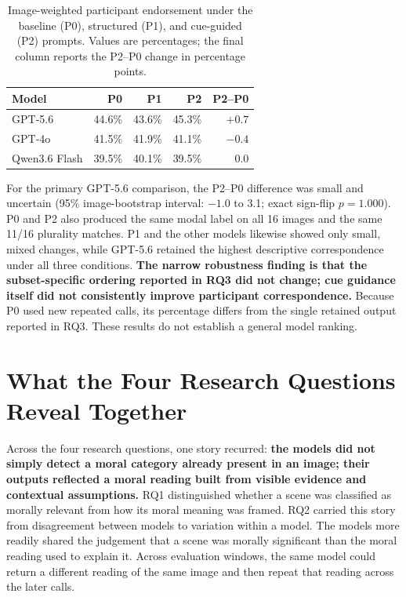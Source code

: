 \begin{table}[H]
    \centering
    \caption{Image-weighted participant endorsement under the baseline (P0),
    structured (P1), and cue-guided (P2) prompts. Values are percentages; the
    final column reports the P2--P0 change in percentage points.}
    \label{tab:prompt_robustness}
    \small
    \begin{tabular}{lrrrr}
        \toprule
        Model & P0 & P1 & P2 & P2--P0 \\
        \midrule
        GPT-5.6       & 44.6\% & 43.6\% & 45.3\% & \(+0.7\) \\
        GPT-4o        & 41.5\% & 41.9\% & 41.1\% & \(-0.4\) \\
        Qwen3.6 Flash & 39.5\% & 40.1\% & 39.5\% & \(0.0\) \\
        \bottomrule
    \end{tabular}
\end{table}

For the primary GPT-5.6 comparison, the P2--P0 difference was small and
uncertain (95\% image-bootstrap interval: \(-1.0\) to 3.1; exact sign-flip
\(p=1.000\)). P0 and P2 also produced the same modal label on all 16 images and
the same 11/16 plurality matches. P1 and the other models likewise
showed only small, mixed changes, while GPT-5.6 retained the highest descriptive
correspondence under all three conditions. \textbf{The narrow robustness
finding is that the subset-specific ordering reported in RQ3 did not change;
cue guidance itself did not consistently improve participant correspondence.}
Because P0 used new repeated calls, its percentage differs from the single
retained output reported in RQ3. These results do not establish a general model
ranking.

\FloatBarrier

\section{What the Four Research Questions Reveal Together}
\label{sec:results_synthesis}

Across the four research questions, one story recurred: \textbf{the models did
not simply detect a moral category already present in an image; their outputs
reflected a moral reading built from visible evidence and contextual
assumptions.} RQ1 distinguished whether a scene was classified as morally
relevant from how its moral meaning was framed. RQ2 carried this story from
disagreement between models to variation within a model. The models more
readily shared the judgement that a scene was morally significant than the
moral reading used to explain it. Across evaluation windows, the same model
could return a different reading of the same image and then repeat that reading
across the later calls.

